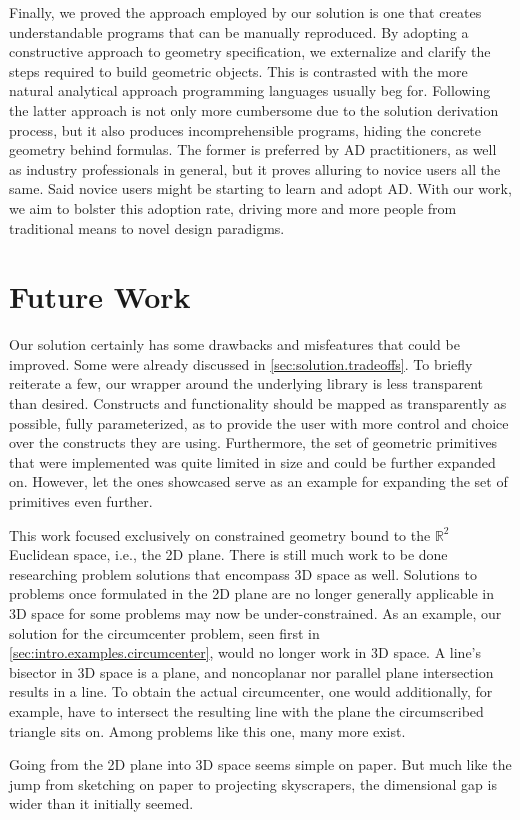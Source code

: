 Finally, we proved the approach employed by our solution is one that creates
understandable programs that can be manually reproduced.  By adopting a
constructive approach to geometry specification, we externalize and clarify the
steps required to build geometric objects.  This is contrasted with the more
natural analytical approach programming languages usually beg for.  Following
the latter approach is not only more cumbersome due to the solution derivation
process, but it also produces incomprehensible programs, hiding the concrete
geometry behind formulas.  The former is preferred by \ac{AD} practitioners, as
well as industry professionals in general, but it proves alluring to novice
users all the same.  Said novice users might be starting to learn and adopt
\ac{AD}.  With our work, we aim to bolster this adoption rate, driving more and
more people from traditional means to novel design paradigms.

\section*{Future Work}

Our solution certainly has some drawbacks and misfeatures that could be
improved.  Some were already discussed in \cref{sec:solution.tradeoffs}.  To
briefly reiterate a few, our wrapper around the underlying library is less
transparent than desired.  Constructs and functionality should be mapped as
transparently as possible, fully parameterized, as to provide the user with more
control and choice over the constructs they are using.  Furthermore, the set of
geometric primitives that were implemented was quite limited in size and could
be further expanded on.  However, let the ones showcased serve as an example for
expanding the set of primitives even further.

This work focused exclusively on constrained geometry bound to the
$\mathbb{R}^2$ Euclidean space, i.e., the 2D plane.  There is still much work to
be done researching problem solutions that encompass 3D space as well.
Solutions to problems once formulated in the 2D plane are no longer generally
applicable in 3D space for some problems may now be under-constrained.  As an
example, our solution for the circumcenter problem, seen first in
\cref{sec:intro.examples.circumcenter}, would no longer work in 3D space.  A
line's bisector in 3D space is a plane, and noncoplanar nor parallel plane
intersection results in a line.  To obtain the actual circumcenter, one would
additionally, for example, have to intersect the resulting line with the plane
the circumscribed triangle sits on.  Among problems like this one, many more
exist.

Going from the 2D plane into 3D space seems simple on paper.  But much like the
jump from sketching on paper to projecting skyscrapers, the dimensional gap is
wider than it initially seemed.
